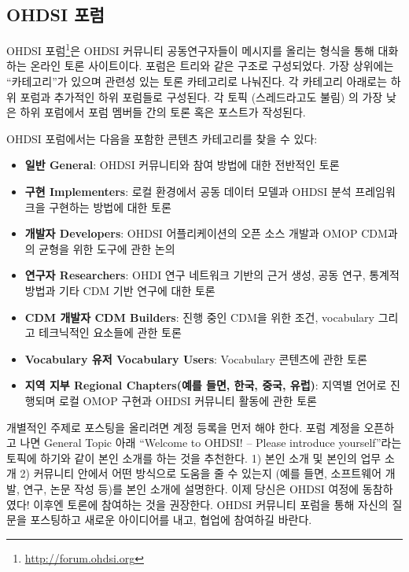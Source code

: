 \documentclass[11pt]{book}
\providecommand{\tightlist}{%
  \setlength{\itemsep}{0pt}\setlength{\parskip}{0pt}}
\let\rmarkdownfootnote\footnote%
\def\footnote{\protect\rmarkdownfootnote}
\theoremstyle{definition}
\theoremstyle{definition}
\theoremstyle{definition}
\theoremstyle{remark}
\begin{document}
\hypertarget{ohdsi-}{\subsection{OHDSI 포럼}\label{ohdsi-}}

OHDSI 포럼\footnote{\url{http://forum.ohdsi.org}}은 OHDSI 커뮤니티
공동연구자들이 메시지를 올리는 형식을 통해 대화하는 온라인 토론
사이트이다. 포럼은 트리와 같은 구조로 구성되었다. 가장 상위에는
``카테고리''가 있으며 관련성 있는 토론 카테고리로 나눠진다. 각 카테고리
아래로는 하위 포럼과 추가적인 하위 포럼들로 구성된다. 각 토픽
(스레드라고도 불림) 의 가장 낮은 하위 포럼에서 포럼 멤버들 간의 토론
혹은 포스트가 작성된다.

OHDSI 포럼에서는 다음을 포함한 콘텐츠 카테고리를 찾을 수 있다:

\begin{itemize}
\tightlist
\item
  \textbf{일반 General}: OHDSI 커뮤니티와 참여 방법에 대한 전반적인 토론
\item
  \textbf{구현 Implementers}: 로컬 환경에서 공동 데이터 모델과 OHDSI
  분석 프레임워크을 구현하는 방법에 대한 토론
\item
  \textbf{개발자 Developers}: OHDSI 어플리케이션의 오픈 소스 개발과 OMOP
  CDM과의 균형을 위한 도구에 관한 논의
\item
  \textbf{연구자 Researchers}: OHDI 연구 네트워크 기반의 근거 생성, 공동
  연구, 통계적 방법과 기타 CDM 기반 연구에 대한 토론
\item
  \textbf{CDM 개발자 CDM Builders}: 진행 중인 CDM을 위한 조건,
  vocabulary 그리고 테크닉적인 요소들에 관한 토론
\item
  \textbf{Vocabulary 유저 Vocabulary Users}: Vocabulary 콘텐츠에 관한
  토론
\item
  \textbf{지역 지부 Regional Chapters(예를 들면, 한국, 중국, 유럽)}:
  지역별 언어로 진행되며 로컬 OMOP 구현과 OHDSI 커뮤니티 활동에 관한
  토론
\end{itemize}

개별적인 주제로 포스팅을 올리려면 계정 등록을 먼저 해야 한다. 포럼
계정을 오픈하고 나면 General Topic 아래 ``Welcome to OHDSI! -- Please
introduce yourself''라는 토픽에 하기와 같이 본인 소개를 하는 것을
추천한다. 1) 본인 소개 및 본인의 업무 소개 2) 커뮤니티 안에서 어떤
방식으로 도움을 줄 수 있는지 (예를 들면, 소프트웨어 개발, 연구, 논문
작성 등)를 본인 소개에 설명한다. 이제 당신은 OHDSI 여정에 동참하였다!
이후엔 토론에 참여하는 것을 권장한다. OHDSI 커뮤니티 포럼을 통해 자신의
질문을 포스팅하고 새로운 아이디어를 내고, 협업에 참여하길 바란다.
\end{document}
